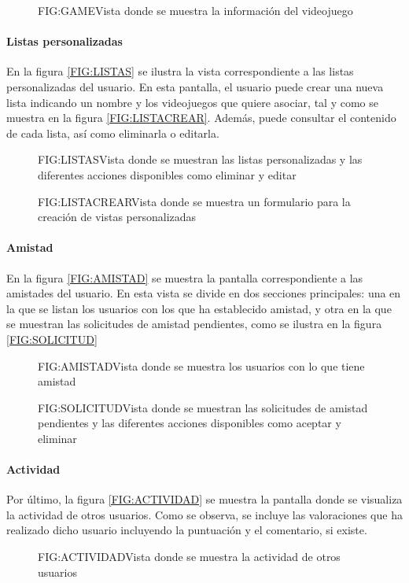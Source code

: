 \begin{figure}[Información del videojuego]{FIG:GAME}{Vista donde se muestra la información del videojuego}
\end{figure}

\paragraph{Listas personalizadas}
En la figura \ref{FIG:LISTAS} se ilustra la vista correspondiente a las listas personalizadas del usuario. En esta pantalla, el usuario puede crear 
una nueva lista indicando un nombre y los videojuegos que quiere asociar, tal y como se muestra en la figura \ref{FIG:LISTACREAR}. Además, puede consultar 
el contenido de cada lista, así como eliminarla o editarla.

\begin{figure}[Listas personalizadas]{FIG:LISTAS}{Vista donde se muestran las listas personalizadas y las diferentes acciones disponibles como eliminar y editar}
\end{figure}

\begin{figure}[Creación de listas personalizadas]{FIG:LISTACREAR}{Vista donde se muestra un formulario para la creación de vistas personalizadas}
\end{figure}

\paragraph{Amistad}
En la figura \ref{FIG:AMISTAD} se muestra la pantalla correspondiente a las amistades del usuario. En esta vista se divide en dos secciones principales: 
una en la que se listan los usuarios con los que ha establecido amistad, y otra en la que se muestran las solicitudes de amistad pendientes, como 
se ilustra en la figura \ref{FIG:SOLICITUD}

\begin{figure}[Amistad entre usuarios]{FIG:AMISTAD}{Vista donde se muestra los usuarios con lo que tiene amistad}
\end{figure}

\begin{figure}[Solicitudes de amistad pendientes]{FIG:SOLICITUD}{Vista donde se muestran las solicitudes de amistad pendientes y las diferentes acciones disponibles como aceptar y eliminar }
\end{figure}

\paragraph{Actividad}
Por último, la figura \ref{FIG:ACTIVIDAD} se muestra la pantalla donde se visualiza la actividad de otros usuarios. Como se observa, se incluye las 
valoraciones que ha realizado dicho usuario incluyendo la puntuación y el comentario, si existe.

\begin{figure}[Actividad de otros usuarios]{FIG:ACTIVIDAD}{Vista donde se muestra la actividad de otros usuarios }
\end{figure}